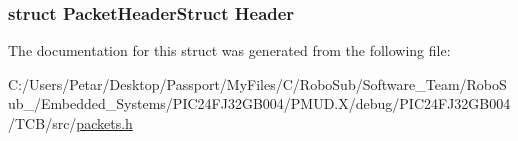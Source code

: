 \subsubsection[{Header}]{\setlength{\rightskip}{0pt plus 5cm}struct {\bf Packet\+Header\+Struct} Header}\label{struct_packet_depth_get_struct_ab201af50281aff5ed4f984f994938007}


The documentation for this struct was generated from the following file\+:\begin{DoxyCompactItemize}
\item 
C\+:/\+Users/\+Petar/\+Desktop/\+Passport/\+My\+Files/\+C/\+Robo\+Sub/\+Software\+\_\+\+Team/\+Robo\+Sub\+\_/\+Embedded\+\_\+\+Systems/\+P\+I\+C24\+F\+J32\+G\+B004/\+P\+M\+U\+D.\+X/debug/\+P\+I\+C24\+F\+J32\+G\+B004/\+T\+C\+B/src/\hyperlink{_p_m_u_d_8_x_2debug_2_p_i_c24_f_j32_g_b004_2_t_c_b_2src_2packets_8h}{packets.\+h}\end{DoxyCompactItemize}
